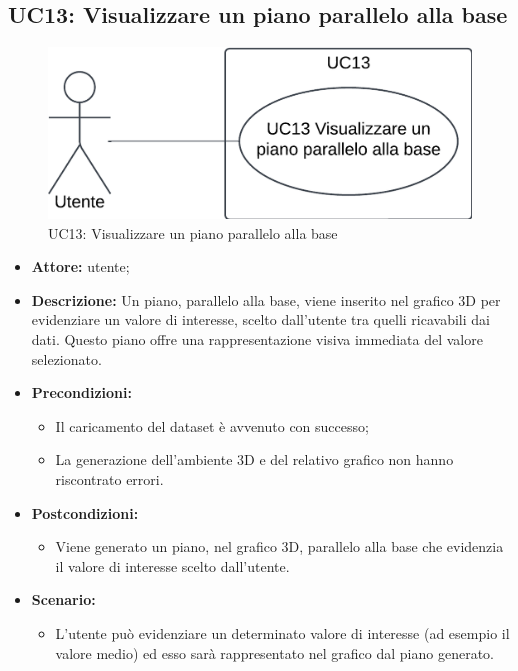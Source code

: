 \subsection{UC13: Visualizzare un piano parallelo alla base}
\begin{figure}[h!]\centering
    \includegraphics[scale=0.7]{template/images/UC13.png}
    \caption{UC13: Visualizzare un piano parallelo alla base}
\end{figure}
\begin{itemize}    
    \item \textbf{Attore:} utente;
    \item \textbf{Descrizione:} Un piano, parallelo alla base, viene inserito nel grafico 3D per evidenziare un valore di interesse, scelto dall'utente tra quelli ricavabili dai dati. Questo piano offre una rappresentazione visiva immediata del valore selezionato.
    \item \textbf{Precondizioni:}    
        \begin{itemize}
            \item Il caricamento del dataset è avvenuto con successo;
            \item La generazione dell'ambiente 3D e del relativo grafico non hanno riscontrato errori.
        \end{itemize}    
    \item \textbf{Postcondizioni:}
        \begin{itemize}
            \item Viene generato un piano, nel grafico 3D, parallelo alla base che evidenzia il valore di interesse scelto dall'utente.
        \end{itemize}    
    \item \textbf{Scenario:} 
        \begin{itemize}
            \item L'utente può evidenziare un determinato valore di interesse (ad esempio il valore medio) ed esso sarà rappresentato nel grafico dal piano generato.
        \end{itemize}
\end{itemize}

